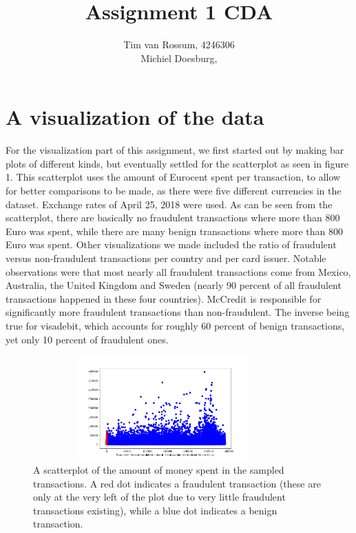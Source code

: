 \documentclass[]{article}
\title{Assignment 1 CDA}
\author{Tim van Rossum, 4246306\\
	Michiel Doesburg,}
\begin{document}
\maketitle

\section{A visualization of the data}
For the visualization part of this assignment, we first started out by making bar plots of different kinds, but eventually settled  for the scatterplot as seen in figure 1. This scatterplot uses the amount of Eurocent spent per transaction, to allow for better comparisons to be made, as there were five different currencies in the dataset. Exchange rates of April 25, 2018 were used. As can be seen from the scatterplot, there are basically no fraudulent transactions where more than 800 Euro was spent, while there are many benign transactions where more than 800 Euro was spent. Other visualizations we made included the ratio of fraudulent versus non-fraudulent transactions per country and per card issuer. Notable observations were that most nearly all fraudulent transactions come from Mexico, Australia, the United Kingdom and Sweden (nearly 90 percent of all fraudulent transactions happened in these four countries). McCredit is responsible for significantly more fraudulent transactions than non-fraudulent. The inverse being true for visadebit, which accounts for roughly 60 percent of benign transactions, yet only 10 percent of fraudulent ones.
\begin{figure}[h!]
	\centering
	\includegraphics[width=10cm,height=4cm]{Visualizations/AmtFraudvsNonFraud2.png}
	\caption{A scatterplot of the amount of money spent in the sampled transactions. A red dot indicates a fraudulent transaction (these are only at the very left of the plot due to very little fraudulent transactions existing), while a blue dot indicates a benign transaction.}
\end{figure}
\clearpage
\end{document}
